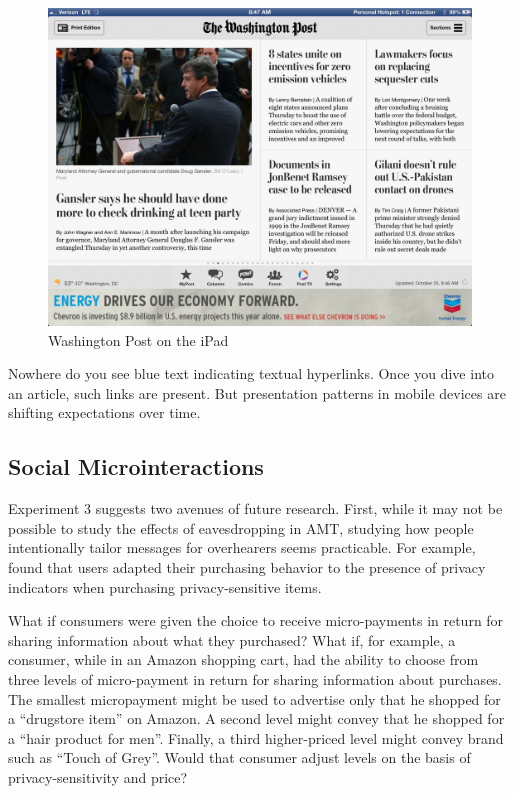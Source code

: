 \begin{figure}
\centerline{
\includegraphics[scale=.1]{chapter8.tex/wash-post}
}
\caption{Washington Post on the iPad}
\label{washpost}
\end{figure}


Nowhere do you see blue text indicating textual hyperlinks. Once you dive into an article, such links are present. But presentation patterns in mobile devices are shifting expectations over time. 

\subsection{Social Microinteractions}
\label{socialmicrointeractions}

Experiment 3 suggests two avenues of future research. First, while it may not be possible to study the effects of eavesdropping in AMT, studying how people intentionally tailor messages for overhearers seems practicable. For example,  \citet{Egelman:2009ut}  found that users adapted their purchasing behavior to the presence of privacy indicators when purchasing privacy-sensitive items. 

What if consumers were given the choice to receive micro-payments in return for sharing information about what they purchased? What if, for example, a consumer, while in an Amazon shopping cart, had the ability to choose from three levels of micro-payment in return for sharing information about purchases. The smallest micropayment might be used to advertise only that he shopped for a ``drugstore item'' on Amazon. A second level might convey that he shopped for a ``hair product for men''. Finally, a third higher-priced level might convey brand such as ``Touch of Grey''. Would that consumer adjust levels on the basis of privacy-sensitivity and price?


